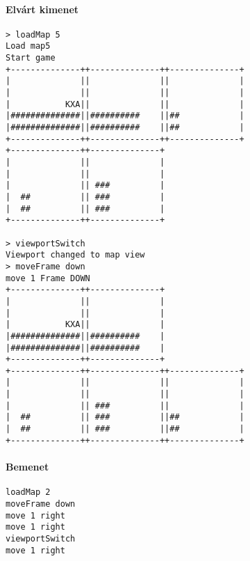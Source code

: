 		        \paragraph*{Elvárt kimenet}
\begin{verbatim}
> loadMap 5
Load map5
Start game
+--------------++--------------++--------------+
|              ||              ||              |
|              ||              ||              |
|           KXA||              ||              |
|##############||##########    ||##            |
|##############||##########    ||##            |
+--------------++--------------++--------------+
+--------------++--------------+                
|              ||              |                
|              ||              |                
|              || ###          |                
|  ##          || ###          |                
|  ##          || ###          |                
+--------------++--------------+                

> viewportSwitch
Viewport changed to map view
> moveFrame down
move 1 Frame DOWN
+--------------++--------------+                
|              ||              |                
|              ||              |                
|           KXA||              |                
|##############||##########    |                
|##############||##########    |                
+--------------++--------------+                
+--------------++--------------++--------------+
|              ||              ||              |
|              ||              ||              |
|              || ###          ||              |
|  ##          || ###          ||##            |
|  ##          || ###          ||##            |
+--------------++--------------++--------------+
\end{verbatim}

		        \paragraph*{Bemenet}
\begin{verbatim}
loadMap 2
moveFrame down
move 1 right
move 1 right
viewportSwitch
move 1 right
\end{verbatim}
